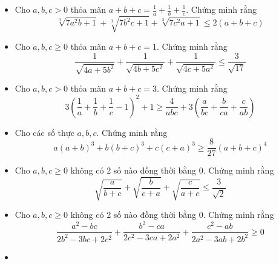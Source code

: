 \documentclass[11pt]{scrartcl}
\begin{document}
\begin{itemize}[label=, leftmargin=0em, itemsep=-0em]

            \item\begin{btvn}
                Cho $a,b,c > 0$ thỏa mãn $a + b + c = \frac{1}{a} + \frac{1}{b} + \frac{1}{c}$. Chứng minh rằng
                \[
                    \sqrt[3]{7a^2b + 1} + \sqrt[3]{7b^2c + 1} + \sqrt[3]{7c^2a + 1} \leq 2(a + b + c)
                \]
            \end{btvn}
            \item\begin{btvn}
                Cho $a,b,c \geq 0$ thỏa mãn $a + b + c = 1$. Chứng minh rằng
                \[
                    \frac{1}{\sqrt{4a + 5b^2}} + \frac{1}{\sqrt{4b + 5c^2}} + \frac{1}{\sqrt{4c + 5a^2}} \leq \frac{3}{\sqrt{17}}
                \]
            \end{btvn}
            \item\begin{btvn}Cho $a,b,c > 0$ thỏa mãn $a + b + c = 3$. Chứng minh rằng
                \[
                    3\left(\frac{1}{a} + \frac{1}{b} + \frac{1}{c} - 1\right)^2 + 1 \geq \frac{4}{abc} + 3\left(\frac{a}{bc} +  \frac{b}{ca} + \frac{c}{ab}\right)
                \]
            \end{btvn}
            \item\begin{btvn}
                Cho các số thực $a,b,c$. Chứng minh rằng
                \[
                    a(a + b)^3 + b(b + c)^3 + c(c +a)^3 \geq \frac{8}{27}(a + b + c)^4
                \]
            \end{btvn}
            \item\begin{btvn}
                Cho $a,b,c \geq 0$ không có 2 số nào đồng thời bằng 0. Chứng minh rằng 
                \[
                    \sqrt{\frac{a}{b +c }} + \sqrt{\frac{b}{ c +a }} + \sqrt{\frac{c}{a + c}} \leq \frac{3}{\sqrt{2}}
                \]
            \end{btvn}
            \item\begin{btvn}
                Cho $a,b,c \geq 0$ không có 2 số nào đồng thời bằng 0. Chứng minh rằng
                \[
                    \frac{a^2 - bc}{2b^2 - 3bc + 2c^2} + \frac{b^2 - ca}{2c^2 - 3ca + 2a^2} + \frac{c^2 - ab}{2a^2 - 3ab + 2b^2} \geq 0
                \]
            \end{btvn}
            \item\begin{btvn}

\end{btvn}
\end{itemize}
\end{document}
